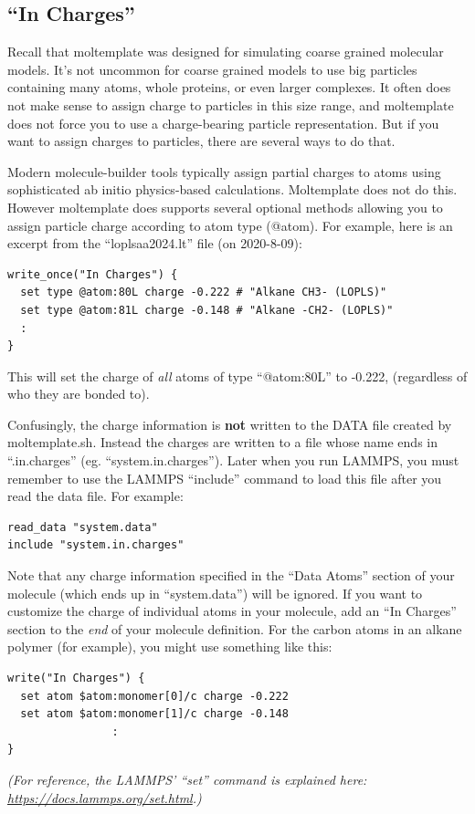\documentclass[11pt]{article}
\begin{document}
\subsection{``In Charges''}
\label{sec:in_charges}
Recall that moltemplate was designed for simulating coarse grained molecular
models.  It's not uncommon for coarse grained models to use big particles
containing many atoms, whole proteins, or even larger complexes.  It often
does not make sense to assign charge to particles in this size range, and
moltemplate does not force you to use a charge-bearing particle representation.
But if you want to assign charges to particles, there are several ways to do
that.

Modern molecule-builder tools typically assign partial charges to atoms
using sophisticated ab initio physics-based calculations.
Moltemplate does not do this.
However moltemplate does supports several optional methods
allowing you to assign particle charge according to atom type (@atom).
For example, here is an excerpt
from the ``loplsaa2024.lt'' file (on 2020-8-09):
\begin{verbatim}
write_once("In Charges") {
  set type @atom:80L charge -0.222 # "Alkane CH3- (LOPLS)"
  set type @atom:81L charge -0.148 # "Alkane -CH2- (LOPLS)"
  :
}
\end{verbatim}
This will set the charge of \textit{all} atoms of type ``@atom:80L'' to -0.222,
(regardless of who they are bonded to).

Confusingly, the charge information is \textbf{not} written to the DATA
file created by moltemplate.sh.  Instead the charges are written to a
file whose name ends in ``.in.charges'' (eg. ``system.in.charges'').
Later when you run LAMMPS, you must remember to use the LAMMPS ``include''
command to load this file after you read the data file.  For example:
\begin{verbatim}
read_data "system.data"
include "system.in.charges"
\end{verbatim}

Note that any charge information specified in the ``Data Atoms'' section
of your molecule (which ends up in ``system.data'') will be ignored.
If you want to customize the charge of individual atoms in your molecule,
add an ``In Charges'' section to the \textit{end} of your molecule definition.
For the carbon atoms in an alkane polymer (for example),
you might use something like this:
\begin{verbatim}
write("In Charges") {
  set atom $atom:monomer[0]/c charge -0.222
  set atom $atom:monomer[1]/c charge -0.148
                :
}
\end{verbatim}
\textit{(For reference, the LAMMPS' ``set'' command is explained here:
        \url{https://docs.lammps.org/set.html}.)}
\end{document}

